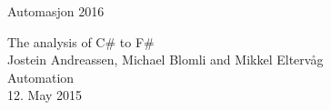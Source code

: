 \documentclass[12pt, a4paper]{article}
\begin{document}
\begin{titlepage}

\Large Automasjon 2016 \\

\vspace{3cm}

\begin{center}
\Huge The analysis of C\# to F\# \vspace{10mm}\\
\large Jostein Andreassen, Michael Blomli and Mikkel Eltervåg \vspace{3mm}\\
Automation \vspace{5mm}\\
12. May 2015
\end{center}

\vspace{5cm}


\end{titlepage}
\end{document}
